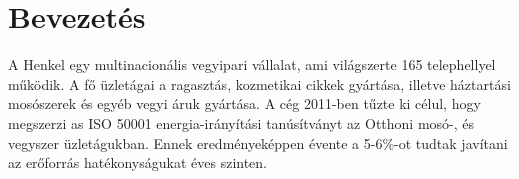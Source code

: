 \section*{Bevezetés}
A Henkel egy multinacionális vegyipari vállalat, ami világszerte 165 telephellyel működik. A fő üzletágai a ragasztás, kozmetikai cikkek gyártása, illetve háztartási mosószerek és egyéb vegyi áruk gyártása. A cég 2011-ben tűzte ki célul, hogy megszerzi as ISO 50001 energia-irányítási tanúsítványt az Otthoni mosó-, és vegyszer üzletágukban. Ennek eredményeképpen évente a 5-6\%-ot tudtak javítani az erőforrás hatékonyságukat éves szinten.